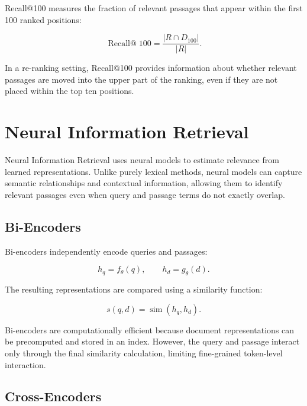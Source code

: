 Recall@100 measures the fraction of relevant passages that appear within the first 100 ranked positions:

\begin{equation}
    \operatorname{Recall@}100 =
    \frac{|R \cap D_{100}|}{|R|}.
\end{equation}

In a re-ranking setting, Recall@100 provides information about whether relevant passages are moved into the upper part of the ranking, even if they are not placed within the top ten positions.

\section{Neural Information Retrieval}
\label{sec:background_neural_ir}

Neural Information Retrieval uses neural models to estimate relevance from learned representations. Unlike purely lexical methods, neural models can capture semantic relationships and contextual information, allowing them to identify relevant passages even when query and passage terms do not exactly overlap.

\subsection{Bi-Encoders}
\label{subsec:background_biencoders}

Bi-encoders independently encode queries and passages:

\begin{equation}
    h_q = f_\theta(q), \qquad h_d = g_\theta(d).
\end{equation}

The resulting representations are compared using a similarity function:

\begin{equation}
    s(q,d) = \operatorname{sim}(h_q,h_d).
\end{equation}

Bi-encoders are computationally efficient because document representations can be precomputed and stored in an index. However, the query and passage interact only through the final similarity calculation, limiting fine-grained token-level interaction.

\subsection{Cross-Encoders}
\label{subsec:background_crossencoders}

